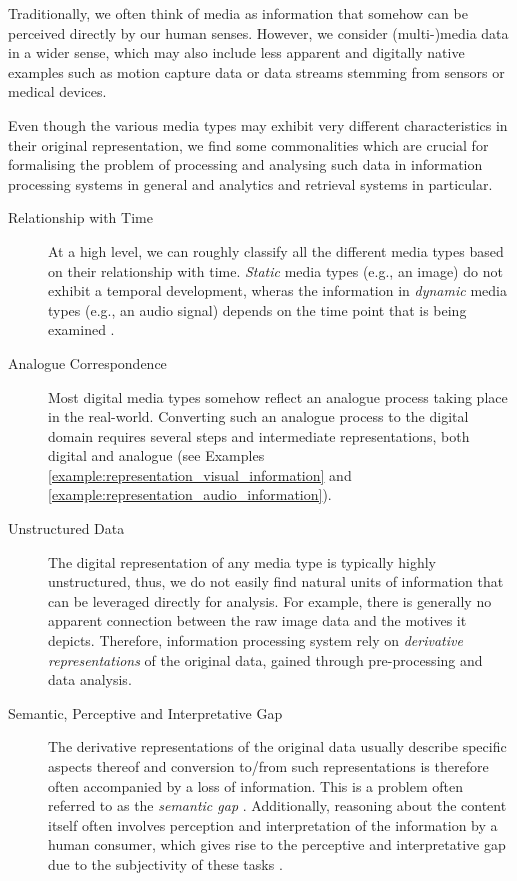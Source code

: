Traditionally, we often think of media as information that somehow can be perceived directly by our human senses. However, we consider (multi-)media data in a wider sense, which may also include less apparent and digitally native examples such as motion capture data or data streams stemming from sensors or medical devices. 

Even though the various media types may exhibit very different characteristics in their original representation, we find some commonalities which are crucial for formalising the problem of processing and analysing such data in information processing systems in general and analytics and retrieval systems in particular.

\begin{description}
    \item[Relationship with Time] At a high level, we can roughly classify all the different media types based on their relationship with time. \emph{Static} media types (e.g., an image) do not exhibit a temporal development, wheras the information in \emph{dynamic} media types (e.g., an audio signal) depends on the time point that is being examined \cite{Blanken:2007multimedia}.

    \item[Analogue Correspondence] Most digital media types somehow reflect an analogue process taking place in the real-world. Converting such an analogue process to the digital domain requires several steps and intermediate representations, both digital and analogue (see Examples \ref{example:representation_visual_information} and \ref{example:representation_audio_information}).

    \item[Unstructured Data] The digital representation of any media type is typically highly unstructured, thus, we do not easily find natural units of information that can be leveraged directly for analysis. For example, there is generally no apparent connection between the raw image data and the motives it depicts. Therefore, information processing system rely on \emph{derivative representations} of the original data, gained through pre-processing and data analysis.
    
    \item[Semantic, Perceptive and Interpretative Gap] The derivative representations of the original data usually describe specific aspects thereof and conversion to/from such representations is therefore often accompanied by a loss of information. This is a problem often referred to as the \emph{semantic gap} \cite{Blanken:2007multimedia, Rossetto:2018thesis}. Additionally, reasoning about the content itself often involves perception and interpretation of the information by a human consumer, which gives rise to the perceptive and interpretative gap due to the subjectivity of these tasks \cite{Rossetto:2018thesis}.

\end{description}

